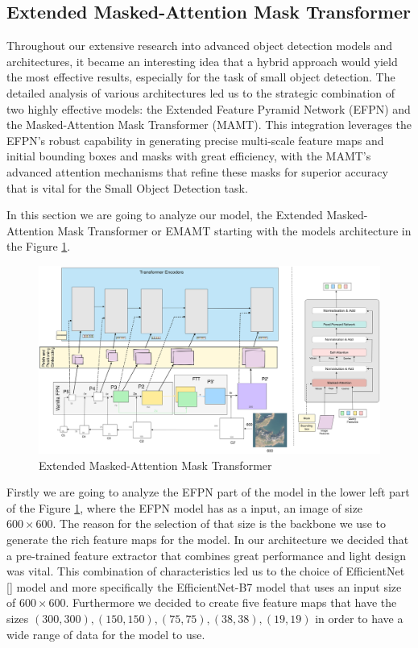 \newpage
\subsection{Extended Masked-Attention Mask Transformer}

Throughout our extensive research into advanced object detection models and architectures, it became an interesting idea that a hybrid approach would 
yield the most effective results, especially for the task of small object detection. The detailed analysis of various architectures led us to the strategic 
combination of two highly effective models: the Extended Feature Pyramid Network (EFPN) and the Masked-Attention Mask Transformer (MAMT). 
This integration leverages the EFPN’s robust capability in generating precise multi-scale feature maps and initial bounding boxes and masks with great efficiency, 
with the MAMT’s advanced attention mechanisms that refine these masks for superior accuracy that is vital for the Small Object Detection task. 

In this section we are going to analyze our model, the Extended Masked-Attention Mask Transformer or EMAMT starting with the models architecture in the Figure
\ref{fig:emamt}.

\begin{figure}[h!]
    \includegraphics[scale=0.05]{Figures/EMAMT.png}
    \caption{Extended Masked-Attention Mask Transformer}
    \label{fig:emamt}
\end{figure}

Firstly we are going to analyze the EFPN part of the model in the lower left part of the Figure \ref{fig:emamt}, where the EFPN model has as a input,
an image of size $600 \times 600$. The reason for the selection of that size is the backbone we use to generate the rich feature maps for the model.
In our architecture we decided that a pre-trained feature extractor that combines great performance and light design was vital. This combination of characteristics
led us to the choice of EfficientNet [] model and more specifically the EfficientNet-B7 model that uses an input size of $600 \times 600$. Furthermore we decided 
to create five feature maps that have the sizes $(300, 300), (150, 150), (75, 75), (38, 38), (19, 19)$ in order to have a wide range of data for the model to use. 

